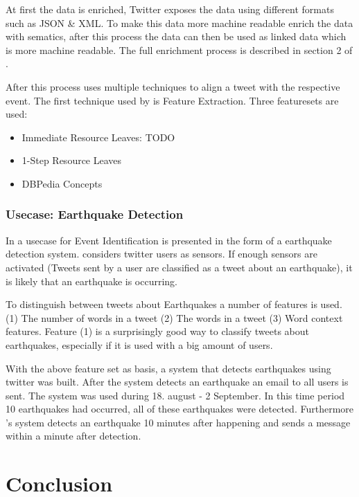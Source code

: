 \documentclass{article}
\begin{document}
At first the data is enriched, Twitter exposes the data using different formats such as JSON \& XML. To make this data more machine readable \cite{eventalign} enrich the data with sematics, after this process the data can then  be used as linked data which is more machine readable. The full enrichment process is described in section 2 of \cite{eventalign}.

After this process \cite{eventalign} uses multiple techniques to align a tweet with the respective event. The first technique used by \cite{eventalign} is Feature Extraction. Three featuresets are used:
\begin{itemize}
  \item Immediate Resource Leaves: TODO
  \item 1-Step Resource Leaves 
  \item DBPedia Concepts 
\end{itemize}

\subsubsection{Usecase: Earthquake Detection}
In \cite{earthq} a usecase for Event Identification is presented in the form of a earthquake detection system. \cite{earthq} considers twitter users as sensors. If enough sensors are activated (Tweets sent by a user are classified as a tweet about an earthquake), it is likely that an earthquake is occurring. 

To distinguish between tweets about Earthquakes a number of features is used. (1) The number of words in a tweet (2) The words in a tweet (3) Word context features. Feature (1) is a surprisingly good way to classify tweets about earthquakes, especially if it is used with a big amount of users. 

With the above feature set as basis, a system that detects earthquakes using twitter was built. After the system detects an earthquake an email to all users is sent. The system was used during 18. august - 2 September. In this time period 10 earthquakes had occurred, all of these earthquakes were detected. Furthermore \cite{earthq}'s system detects an earthquake 10 minutes after happening and sends a message within a minute after detection. 
\section{Conclusion}



\end{document}
